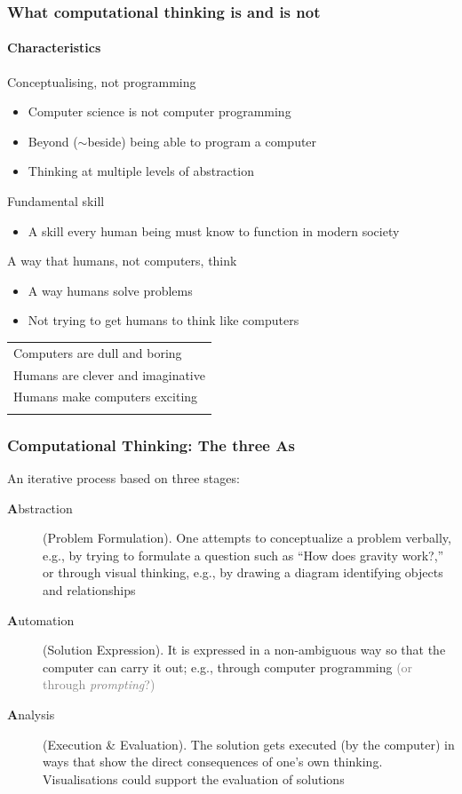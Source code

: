 \documentclass[xcolor=x11names,handout]{beamer}
\newcommand{\light}[1]{\textcolor{gray}{#1}}
\begin{document}
\begin{frame}
\frametitle{What computational thinking is and is not}
\framesubtitle{Characteristics}

\alert{Conceptualising, not programming}

\begin{itemize}
 \item Computer science is \alert{not} computer programming
 \item Beyond ($\sim$beside) being able to program a computer
 \item Thinking at multiple levels of abstraction
\end{itemize}			\pause

\alert{Fundamental skill}
\begin{itemize}
 \item A skill every human being must know to function in modern society
\end{itemize}	\pause

\alert{A way that humans, not computers, think}
\begin{itemize}
 \item A way humans solve problems
 \item Not trying to get humans to think like computers
\end{itemize}							\pause

\centering
\begin{tabular}{l}
Computers are dull and boring		\\	\pause 
Humans are clever and imaginative	\\	\pause  
Humans make computers exciting		\\	\pause 
\end{tabular}
\end{frame}

\begin{frame}
\frametitle{Computational Thinking: The three As}

An iterative process based on three stages:

\begin{description}
	\item[\textbf{A}bstraction]	(Problem Formulation).
		One attempts to conceptualize a problem verbally, e.g., by trying to 
formulate a question such as ``How does gravity work?,'' or through visual 
thinking, e.g., by drawing a diagram identifying objects and relationships
		\pause

	\item[\textbf{A}utomation]	(Solution Expression).
	 	It is expressed in a non-ambiguous way so that the computer	can carry 
it 
out; e.g., through computer programming \light{(or through \textit{prompting}?)}
		\pause

	\item[\textbf{A}nalysis]  (Execution \& Evaluation).
	The solution gets executed (by the computer) in ways that show the direct 
consequences of one's own thinking. Visualisations could support the evaluation 
of solutions
\end{description}

\onslide
\flushright
\footnotesize
\citep{Repenning:16}
\end{frame}
\end{document}
